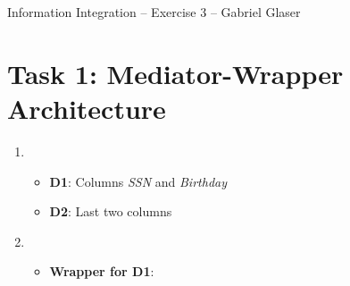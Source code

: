 \documentclass{scrartcl}
\begin{document}
	\begin{center}
		\LARGE
		Information Integration -- Exercise 3 -- Gabriel Glaser
	\end{center}
	
	\section*{Task 1: Mediator-Wrapper Architecture}
	\begin{enumerate}
				\item\phantom{phantom}
		\begin{itemize}
			\item \textbf{D1}: Columns \textit{SSN} and \textit{Birthday}
			\item \textbf{D2}: Last two columns
		\end{itemize}
		
		\item\phantom{phantom}
		\begin{itemize}
			\item\textbf{Wrapper for D1}:
			\begin{center}
			\end{center}
			

\end{itemize}
\end{enumerate}
\end{document}
